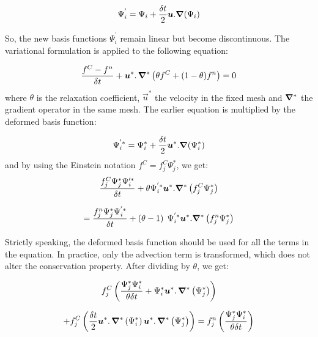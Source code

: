 \begin{equation}
\Psi_{i}^{^{\prime}}=\Psi_{i}+\dfrac{\delta t}{2}\vec{u}.\Grad%
(\Psi_{i})
\end{equation}

So, the new basis functions $\Psi_{i}^{^{\prime}}$ remain linear but become
discontinuous. The variational formulation is applied to the following equation:%

\begin{equation}
\dfrac{f^{C}-f^{n}}{\delta t}+\vec{u}^{\ast}.\,\Grad%
^{\ast}\left(  \theta f^{C}+(1-\theta)f^{n}\right)  =0
\end{equation}
where $\theta$ is the relaxation coefficient, $\vec{u}^{\ast}$ the
velocity in the fixed mesh and $\bm{\nabla}^{\ast}$ the gradient
operator in the same mesh. The earlier equation is multiplied by the deformed
basis function:%

\begin{equation}
\Psi_{i}^{^{\prime}\ast}=\Psi_{i}^{\ast}+\dfrac{\delta t}{2}\vec{u}%
^{\ast}.\Grad(\Psi_{i}^{\ast}) \label{baseupwind}%
\end{equation}
and by using the Einstein notation $f^{C}=f_{j}^{C}\Psi_{j}^{\ast}$, we get:%
\begin{equation}
\dfrac{f_{j}^{C}\Psi_{j}^{\ast}\Psi_{i}^{\prime\ast}}{\delta t}+\theta\Psi
_{i}^{^{\prime}\ast}\bm{u}^{\ast}.\bm{\nabla}^{\ast
}\left(  f_{j}^{C}\Psi_{j}^{\ast}\right)
\end{equation}

\begin{equation}
=\dfrac{f_{j}^{n}\Psi_{j}^{\ast}\Psi_{i}^{^{\prime}\ast}}{\delta t}+\left(
\theta-1\right)  \;\Psi_{i}^{^{\prime}\ast}\bm{u}^{\ast
}.\bm{\nabla}^{\ast}\left(  f_{j}^{n}\Psi_{j}^{\ast}\right)
\end{equation}

Strictly speaking, the deformed basis function should be used for all the
terms in the equation. In practice, only the advection term is transformed,
which does not alter the conservation property. After dividing by $\theta$, we get:%

\begin{equation}
f_{j}^{C}\left(  \dfrac{\Psi_{j}^{\ast}\Psi_{i}^{\ast}}{\theta\delta t}%
+\Psi_{i}^{\ast}\vec{u}^{\ast}.\,\Grad^{\ast
}\left(  \Psi_{j}^{\ast}\right)  \right)
\end{equation}
%

\begin{equation}
+f_{j}^{C}\left(  \dfrac{\delta t}{2}\vec{u}^{\ast}.\,\Grad%
^{\ast}\left(  \Psi_{i}^{\ast}\right)  \vec{u}^{\ast}%
.\,\Grad^{\ast}\left(  \Psi_{j}^{\ast}\right)  \right)
=f_{j}^{n}\left(  \dfrac{\Psi_{j}^{\ast}\Psi_{i}^{\ast}}{\theta\delta
t}\right)
\end{equation}
%

